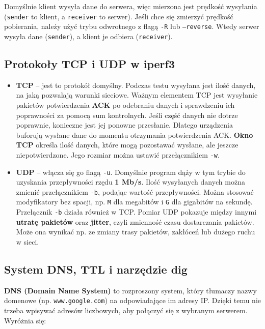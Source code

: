 \documentclass[11pt,a4paper]{article}
\begin{document}
Domyślnie klient wysyła dane do serwera, więc mierzona jest prędkość wysyłania (\texttt{sender} to klient, a \texttt{receiver} to serwer). Jeśli chce się zmierzyć prędkość pobierania, należy użyć trybu odwrotnego z flagą \texttt{-R} lub \texttt{--reverse}. Wtedy serwer wysyła dane (\texttt{sender}), a klient je odbiera (\texttt{receiver}).

\subsection*{Protokoły TCP i UDP w iperf3}

\begin{itemize}
    \item \textbf{TCP} -- jest to protokół domyślny. Podczas testu wysyłana jest ilość danych, na jaką pozwalają warunki sieciowe. Ważnym elementem TCP jest wysyłanie pakietów potwierdzenia \textbf{ACK} po odebraniu danych i sprawdzeniu ich poprawności za pomocą sum kontrolnych. Jeśli część danych nie dotrze poprawnie, konieczne jest jej ponowne przesłanie. Dlatego urządzenia buforują wysłane dane do momentu otrzymania potwierdzenia ACK. \textbf{Okno TCP} określa ilość danych, które mogą pozostawać wysłane, ale jeszcze niepotwierdzone. Jego rozmiar można ustawić przełącznikiem \texttt{-w}.
    
    \item \textbf{UDP} -- włącza się go flagą \texttt{-u}. Domyślnie program dąży w tym trybie do uzyskania przepływności rzędu \textbf{1 Mb/s}. Ilość wysyłanych danych można zmienić przełącznikiem \texttt{-b}, podając wartość przepływności. Można stosować modyfikatory bez spacji, np. \texttt{M} dla megabitów i \texttt{G} dla gigabitów na sekundę. Przełącznik \texttt{-b} działa również w TCP. Pomiar UDP pokazuje między innymi \textbf{utratę pakietów} oraz \textbf{jitter}, czyli zmienność czasu dostarczania pakietów. Może ona wynikać np. ze zmiany trasy pakietów, zakłóceń lub dużego ruchu w sieci.
\end{itemize}

\subsection*{System DNS, TTL i narzędzie dig}

\textbf{DNS (Domain Name System)} to rozproszony system, który tłumaczy nazwy domenowe (np. \texttt{www.google.com}) na odpowiadające im adresy IP. Dzięki temu nie trzeba wpisywać adresów liczbowych, aby połączyć się z wybranym serwerem. Wyróżnia się:
\end{document}
